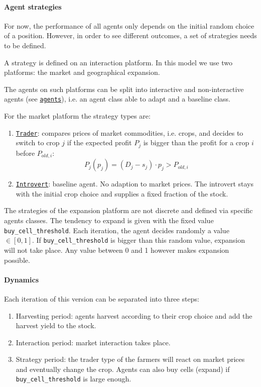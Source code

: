 \documentclass[a4paper,12pt]{article} %
\begin{document}
\paragraph{Agent strategies}
For now, the performance of all agents only depends on the initial random choice of a position. However, in order to see different outcomes, a set of strategies needs to be defined.

A strategy is defined on an interaction platform. In this model we use two platforms: the market and geographical expansion.

The agents on such platforms can be split into interactive and non-interactive agents (see \href{https://n.ethz.ch/~cgolling/gess/html/code/agents.html}{\texttt{agents}}), i.e. an agent class able to adapt and a baseline class.

For the market platform the strategy types are:
\begin{enumerate}
        \item \href{https://n.ethz.ch/~cgolling/gess/html/code/agents.html#agents.Trader}{\texttt{Trader}}: compares prices of market commodities, i.e. crops, and decides to switch to crop $j$ if the expected profit $P_j$ is bigger than the profit for a crop $i$ before $P_{old,i}$:
        \begin{equation}
            P_j (p_j) = (D_j - s_j) \cdot p_j > P_{old,i}
        \end{equation}
        \item \href{https://n.ethz.ch/~cgolling/gess/html/code/agents.html#agents.Introvert}{\texttt{Introvert}}: baseline agent. No adaption to market prices. The introvert stays with the initial crop choice and supplies a fixed fraction of the stock.
\end{enumerate}

The strategies of the expansion platform are not discrete and defined via specific agents classes. The tendency to expand is given with the fixed value \texttt{buy\_cell\_threshold}. Each  iteration, the agent decides randomly a value $\in[0,1]$. If \texttt{buy\_cell\_threshold} is bigger than this random value, expansion will not take place. Any value between 0 and 1 however makes expansion possible.

\paragraph{Dynamics}

Each iteration of this version can be separated into three steps:
\begin{enumerate}
    \item Harvesting period: agents harvest according to their crop choice and add the harvest yield to the stock. 
    \item Interaction period: market interaction takes place.
    \item Strategy period: the trader type of the farmers will react on market prices and eventually change the crop. Agents can also buy cells (expand) if \texttt{buy\_cell\_threshold} is large enough.
\end{enumerate}
\end{document}
